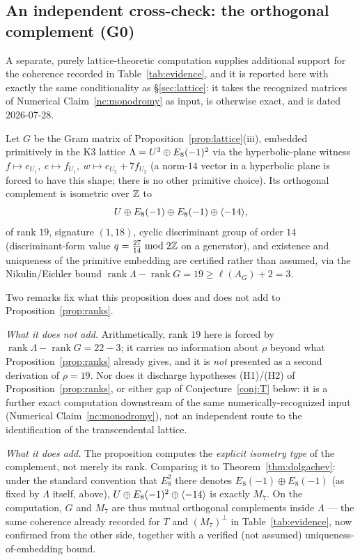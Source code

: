 \subsection{An independent cross-check: the orthogonal complement (G0)}
\label{subsec:g0}

A separate, purely lattice-theoretic computation supplies additional support
for the coherence recorded in Table~\ref{tab:evidence}, and it is reported
here with exactly the same conditionality as \S\ref{sec:lattice}: it takes the
recognized matrices of Numerical Claim~\ref{nc:monodromy} as input, is
otherwise exact, and is dated 2026-07-28.

\begin{proposition}\label{prop:g0complement}
Let $G$ be the Gram matrix of Proposition~\ref{prop:lattice}(iii), embedded
primitively in the K3 lattice $\Lambda = U^3\oplus E_8(-1)^2$ via the
hyperbolic-plane witness $f\mapsto e_{U_1},\ e\mapsto f_{U_1},\ w\mapsto
e_{U_2}+7f_{U_2}$ (a norm-$14$ vector in a hyperbolic plane is forced to have
this shape; there is no other primitive choice). Its orthogonal complement is
isometric over $\mathbb{Z}$ to
\[
  U \oplus E_8(-1) \oplus E_8(-1) \oplus \langle -14\rangle,
\]
of rank $19$, signature $(1,18)$, cyclic discriminant group of order $14$
(discriminant-form value $q = \tfrac{27}{14} \bmod 2\mathbb{Z}$ on a generator), and
existence and uniqueness of the primitive embedding are certified rather than
assumed, via the Nikulin/Eichler bound $\operatorname{rank}\Lambda -
\operatorname{rank}G = 19 \ge \ell(A_G) + 2 = 3$.
\end{proposition}

Two remarks fix what this proposition does and does not add to
Proposition~\ref{prop:ranks}.

\emph{What it does not add.} Arithmetically, rank $19$ here is forced by
$\operatorname{rank}\Lambda - \operatorname{rank}G = 22 - 3$; it carries no
information about $\rho$ beyond what Proposition~\ref{prop:ranks} already
gives, and it is \emph{not} presented as a second derivation of $\rho = 19$.
Nor does it discharge hypotheses (H1)/(H2) of Proposition~\ref{prop:ranks}, or
either gap of Conjecture~\ref{conj:T} below: it is a further exact computation
downstream of the same numerically-recognized input (Numerical
Claim~\ref{nc:monodromy}), not an independent route to the identification of
the transcendental lattice.

\emph{What it does add.} The proposition computes the \emph{explicit isometry
type} of the complement, not merely its rank. Comparing it to
Theorem~\ref{thm:dolgachev}: under the standard convention that $E_8^2$
there denotes $E_8(-1)\oplus E_8(-1)$ (as fixed by $\Lambda$ itself, above),
$U\oplus E_8(-1)^2\oplus\langle -14\rangle$ is exactly $M_7$. On the computation, $G$
and $M_7$ are thus mutual orthogonal complements inside $\Lambda$ --- the same
coherence already recorded for $T$ and $(M_7)^{\perp}$ in
Table~\ref{tab:evidence}, now confirmed from the other side, together with a
verified (not assumed) uniqueness-of-embedding bound.

